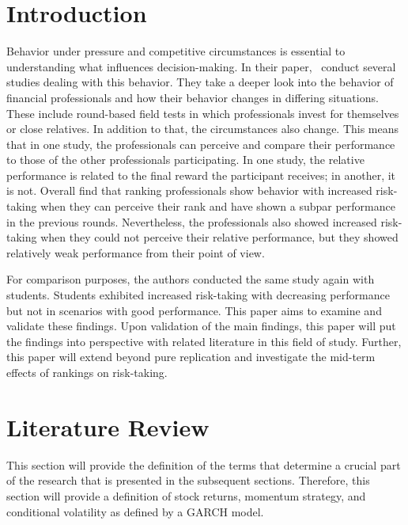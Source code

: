 \documentclass[12pt]{article}
\begin{document}
\clearpage
\hypersetup{																		%
    citecolor = blue,
    filecolor = blue,
    linkcolor = blue,
    urlcolor = blue
}

\section{Introduction}
Behavior under pressure and competitive circumstances is essential to understanding what influences decision-making. In their paper, \textcite[p.~2295]{Kirchler2018} conduct several studies dealing with this behavior. They take a deeper look into the behavior of financial professionals and how their behavior changes in differing situations. These include round-based field tests in which professionals invest for themselves or close relatives. In addition to that, the circumstances also change. This means that in one study, the professionals can perceive and compare their performance to those of the other professionals participating. In one study, the relative performance is related to the final reward the participant receives; in another, it is not. Overall \textcite{HAIGH2005} find that ranking professionals show behavior with increased risk-taking when they can perceive their rank and have shown a subpar performance in the previous rounds. Nevertheless, the professionals also showed increased risk-taking when they could not perceive their relative performance, but they showed relatively weak performance from their point of view. \par
For comparison purposes, the authors conducted the same study again with students. Students exhibited increased risk-taking with decreasing performance but not in scenarios with good performance. This paper aims to examine and validate these findings. Upon validation of the main findings, this paper will put the findings into perspective with related literature in this field of study. Further, this paper will extend beyond pure replication and investigate the mid-term effects of rankings on risk-taking.
\par

\section{Literature Review} \label{section:literature_review}
This section will provide the definition of the terms that determine a crucial part of the research that is presented in the subsequent sections. Therefore, this section will provide a definition of stock returns, momentum strategy, and conditional volatility as defined by a GARCH model.
\end{document}
